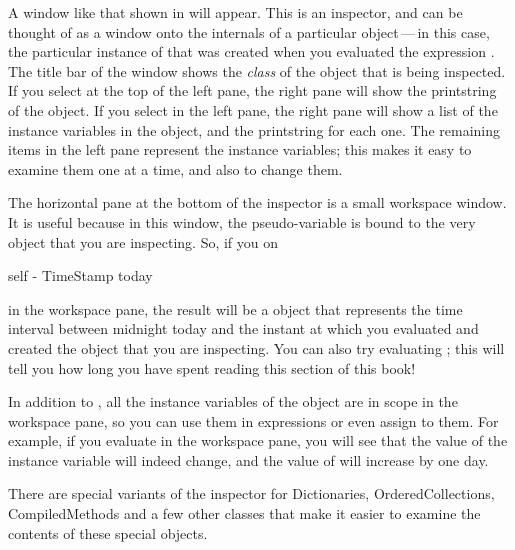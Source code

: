\documentclass[a4paper,10pt,twoside]{book}
\begin{document}
A window like that shown in  will appear.   
This is an inspector, and can be thought of as a window onto the internals of a particular object\,---\,in this case, the particular instance of \mbox{} 
that was created when you evaluated the expression .
The title bar of the window shows the \emph{class} of the object that is being inspected.
If you select  at the top of the left pane, the right pane will show the printstring of the object.
If you select  in the left pane, the right pane will show a list of the instance variables in the object, and the printstring for each one.  
The remaining items in the left pane represent the instance variables; this makes it easy to examine them one at a time, and also to change them.

The horizontal pane at the bottom of the inspector is a small workspace window.  It is useful because in this window, the pseudo-variable  is bound to the very object that you are inspecting.  
So, if you  on
\begin{code}{}
self - TimeStamp today
\end{code}
in the workspace pane, the result will be a  object that represents the time interval between midnight today and the instant at which you evaluated   and created the  object that you are inspecting.
You can also try evaluating ; this will tell you how long you have spent reading this section of this book!

In addition to , all the instance variables of the object are in scope in the workspace pane, so you can use them in expressions or even assign to them.  For example, if you evaluate  in the workspace pane, you will see that the value of the  instance variable will indeed change, and the value of  will increase by one day.


There are special variants of the inspector for Dictionaries, OrderedCollections, CompiledMethods and a few other classes that make it easier to examine the contents of these special objects.
\end{document}
